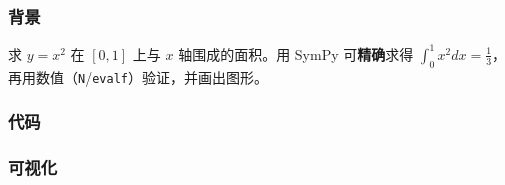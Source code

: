 \subsubsection{背景}\label{ux80ccux666f-2}

求 \(y=x^2\) 在 \([0,1]\) 上与 \(x\) 轴围成的面积。用 SymPy
可\textbf{精确}求得
\(\int_0^1 x^2 dx=\frac{1}{3}\)，再用数值（\texttt{N}/\texttt{evalf}）验证，并画出图形。

\subsubsection{代码}\label{ux4ee3ux7801-14}

\begin{Shaded}
\begin{Highlighting}[]
\OperatorTok{=}\NormalTok{)}
\OperatorTok{=}\OperatorTok{**}
\OperatorTok{=}\NormalTok{, }\NormalTok{))}
\end{Highlighting}
\end{Shaded}

\begin{Shaded}
\begin{Highlighting}[]
\end{Highlighting}
\end{Shaded}

\subsubsection{可视化}\label{ux53efux89c6ux5316}

